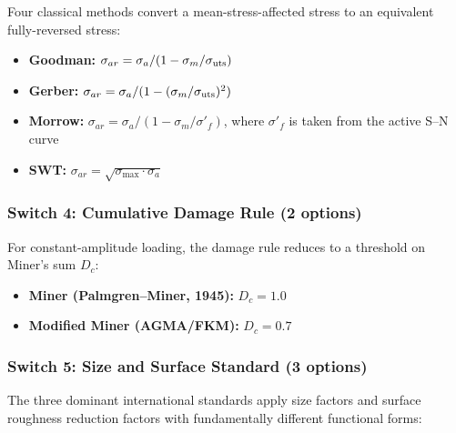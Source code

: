 \documentclass[12pt,a4paper]{article}
\begin{document}
Four classical methods convert a mean-stress-affected stress to an
equivalent fully-reversed stress:

\begin{itemize}
  \item \textbf{Goodman:}
        $\sigma_{ar} = \sigma_a / (1 - \sigma_m/\sigma_{\rm uts})$
  \item \textbf{Gerber:}
        $\sigma_{ar} = \sigma_a / (1 - (\sigma_m/\sigma_{\rm uts})^2)$
  \item \textbf{Morrow:}
        $\sigma_{ar} = \sigma_a / (1 - \sigma_m/\sigma'_f)$,
        where $\sigma'_f$ is taken from the active S--N curve
  \item \textbf{SWT:}
        $\sigma_{ar} = \sqrt{\sigma_{\max} \cdot \sigma_a}$
\end{itemize}

\subsubsection{Switch 4: Cumulative Damage Rule (2 options)}

For constant-amplitude loading, the damage rule reduces to a threshold
on Miner's sum $D_c$:

\begin{itemize}
  \item \textbf{Miner (Palmgren--Miner, 1945):} $D_c = 1.0$
  \item \textbf{Modified Miner (AGMA/FKM):} $D_c = 0.7$
\end{itemize}

\subsubsection{Switch 5: Size and Surface Standard (3 options)}

The three dominant international standards apply size factors and surface
roughness reduction factors with fundamentally different functional forms:
\end{document}
